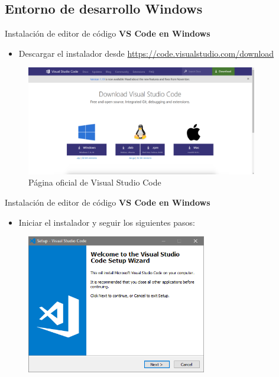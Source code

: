 \subsection{Entorno de desarrollo Windows}


\begin{frame}[fragile]{Instalación de editor de código}
  \textbf{VS Code en Windows}
  \begin{itemize}
    \item Descargar el instalador desde \url{https://code.visualstudio.com/download}
  \end{itemize}  
    \begin{figure}
      \includegraphics[width=0.9\textwidth]{./resources/1.png}
      \caption*{Página oficial de Visual Studio Code}
    \end{figure}

\end{frame}


\begin{frame}[fragile]{Instalación de editor de código}
  \textbf{VS Code en Windows}
   \begin{itemize}
    \item Iniciar el instalador y seguir los siguientes pasos:
   \end{itemize} 
   \begin{figure}
      \includegraphics[width=0.7\textwidth]{./resources/VSCODE_Step_01.PNG}
   \end{figure}
\end{frame}

